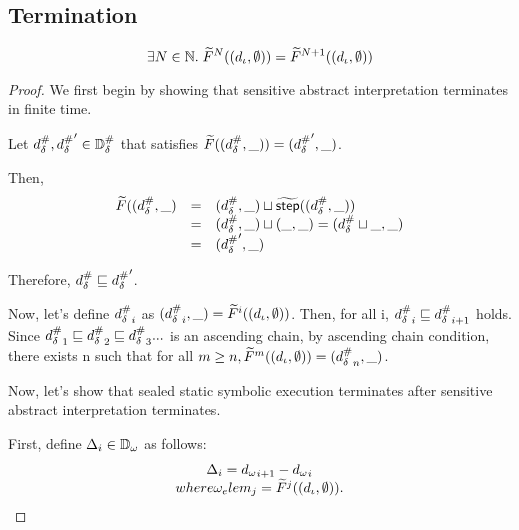 \subsection{Termination}

\begin{theorem}[Termination]\label{theorem:termination}
  \[
    \exists N \in \mathbb{N}. \; {\widetilde{F}}^N((d_\iota, \emptyset))
    = {\widetilde{F}}^{N+1}((d_\iota, \emptyset))
  \]
\end{theorem}

\begin{proof}
We first begin by showing that sensitive abstract interpretation terminates in
finite time.


Let ${{d}^{\#}_\delta}, {{d}^{\#}_\delta}' \in {\mathbb{D}}^{\#}_\delta$ that satisfies
$\widetilde{F}(({{d}^{\#}_\delta}, \_)) = ({{d}^{\#}_\delta}', \_)$.

Then,
\[
  \begin{array}{rcl}
  \widetilde{F}(({{d}^{\#}_\delta}, \_)
  &=& ({{d}^{\#}_\delta}, \_) \sqcup \widetilde{\textsf{step}}(({{d}^{\#}_\delta}, \_))\\
  &=& ({{d}^{\#}_\delta}, \_) \sqcup (\_, \_) = ({{d}^{\#}_\delta} \sqcup \_, \_)\\
  &=& ({{d}^{\#}_\delta}', \_)
  \end{array}
\]

Therefore, ${{d}^{\#}_\delta} \sqsubseteq {{d}^{\#}_\delta}'$.

Now, let's define ${{d}^{\#}_\delta}_i$ as  $({{d}^{\#}_\delta}_i, \_) = \widetilde{F}^i((d_\iota, \emptyset))$.
Then, for all i, ${{d}^{\#}_\delta}_i \sqsubseteq {{d}^{\#}_\delta}_{i+1}$ holds.
Since ${{d}^{\#}_\delta}_1 \sqsubseteq {{d}^{\#}_\delta}_2 \sqsubseteq {{d}^{\#}_\delta}_3 ...$ is an ascending chain,
by ascending chain condition, there exists n such that
for all $m \geq n, \widetilde{F}^m((d_\iota, \emptyset)) = ({{d}^{\#}_\delta}_n, \_)$.

Now, let's show that sealed static symbolic execution terminates after
sensitive abstract interpretation terminates.

First, define  $\Delta_i \in {\mathbb{D}}_\omega$ as follows:
\[
  \begin{array}{c}
    \Delta_i = {{d}_\omega}_{i+1} - {{d}_\omega}_i\\
    where \omega_elem_j = \widetilde{F}^j((d_\iota, \emptyset)).
  \end{array}
\]

\end{proof}
